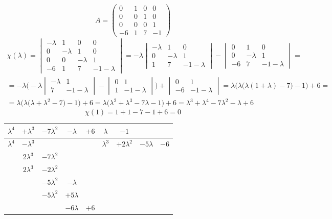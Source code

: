 $$ A =
\begin{pmatrix}
	0 & 1 & 0 & 0 \\
    0 & 0 & 1 & 0 \\
    0 & 0 & 0 & 1 \\
    -6 & 1 & 7 & -1
\end{pmatrix} $$
\begin{multline*}
    \chi(\lambda) =
    \begin{vmatrix}
        -\lambda & 1 & 0 & 0 \\
        0 & -\lambda & 1 & 0 \\
        0 & 0 & -\lambda & 1 \\
        -6 & 1 & 7 & -1 - \lambda
    \end{vmatrix} = -\lambda
    \begin{vmatrix}
    	-\lambda & 1 & 0 \\
        0 & -\lambda & 1 \\
        1 & 7 & -1 - \lambda
    \end{vmatrix} -
    \begin{vmatrix}
    	0 & 1 & 0 \\
        0 & -\lambda & 1 \\
        -6 & 7 & -1 - \lambda
    \end{vmatrix} = \\
    = -\lambda \bigg( -\lambda
    \begin{vmatrix}
    	-\lambda & 1 \\
        7 & -1 - \lambda
    \end{vmatrix} -
    \begin{vmatrix}
    	0 & 1 \\
        1 & -1 - \lambda
    \end{vmatrix} \bigg) +
    \begin{vmatrix}
    	0 & 1 \\
        -6 & -1 - \lambda
    \end{vmatrix} = \lambda \bigg( \lambda \big( \lambda(1 + \lambda) - 7 \big) - 1 \bigg) + 6 = \\
    = \lambda \bigg( \lambda \big( \lambda + \lambda^2 - 7 \big) - 1 \bigg) + 6 = \lambda \bigg( \lambda^2 + \lambda^3 - 7\lambda - 1 \bigg) + 6 = \lambda^3 + \lambda^4 - 7\lambda^2 - \lambda + 6
\end{multline*}
$$ \chi(1) = 1 + 1 - 7 - 1 + 6 = 0 $$
\begin{tabular}{c c c c c | c c c c}
	$ \lambda^4 $ & $ + \lambda^3 $ & $ - 7\lambda^2 $ & $ -\lambda $ & $ + 6 $ & $ \lambda $ & $ -1 $ \\
    \hline
    $ \lambda^4 $ & $ -\lambda^3 $ & & & & $ \lambda^3 $ & $ +2\lambda^2 $ & $ -5\lambda $ & $ -6 $ \\
    \hline
    & $ 2\lambda^3 $ & $ -7\lambda^2 $ & & \\
    & $ 2\lambda^3 $ & $ -2\lambda^2 $ & & \\
    \hline
    & & $ -5\lambda^2 $ & $ -\lambda $ & \\
    & & $ -5\lambda^2 $ & $ +5\lambda $ & \\
    \hline
    & & & $ -6\lambda $ & $ +6 $
\end{tabular}
